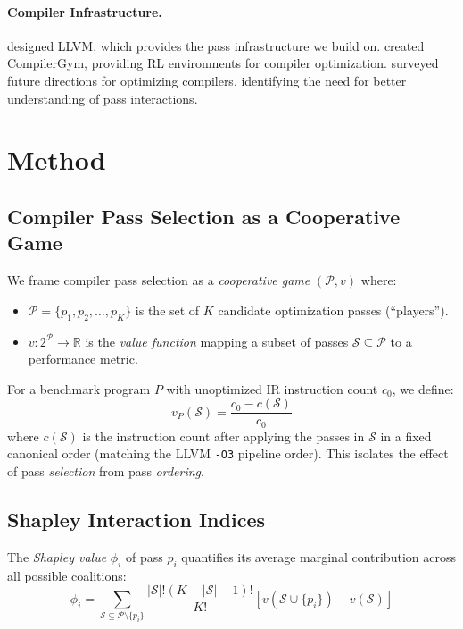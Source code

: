 \documentclass[preprint]{article}
\newcommand{\shapval}{\phi}
\newcommand{\passset}{\mathcal{S}}
\newcommand{\allpasses}{\mathcal{P}}
\newcommand{\valfn}{v}
\begin{document}
\paragraph{Compiler Infrastructure.}
\citet{lattner2004llvm} designed LLVM, which provides the pass infrastructure we build on. \citet{cummins2022compilergym} created CompilerGym, providing RL environments for compiler optimization. \citet{lopes2018future} surveyed future directions for optimizing compilers, identifying the need for better understanding of pass interactions.

\section{Method}
\label{sec:method}

\subsection{Compiler Pass Selection as a Cooperative Game}

We frame compiler pass selection as a \emph{cooperative game} $(\allpasses, \valfn)$ where:
\begin{itemize}
    \item $\allpasses = \{p_1, p_2, \ldots, p_K\}$ is the set of $K$ candidate optimization passes (``players'').
    \item $\valfn: 2^{\allpasses} \to \mathbb{R}$ is the \emph{value function} mapping a subset of passes $\passset \subseteq \allpasses$ to a performance metric.
\end{itemize}

For a benchmark program $P$ with unoptimized IR instruction count $c_0$, we define:
\begin{equation}
    \valfn_P(\passset) = \frac{c_0 - c(\passset)}{c_0}
\end{equation}
where $c(\passset)$ is the instruction count after applying the passes in $\passset$ in a fixed canonical order (matching the LLVM \texttt{-O3} pipeline order). This isolates the effect of pass \emph{selection} from pass \emph{ordering}.

\subsection{Shapley Interaction Indices}

The \emph{Shapley value} $\shapval_i$ of pass $p_i$ quantifies its average marginal contribution across all possible coalitions:
\begin{equation}
    \shapval_i = \sum_{\passset \subseteq \allpasses \setminus \{p_i\}} \frac{|\passset|!(K - |\passset| - 1)!}{K!} \left[\valfn(\passset \cup \{p_i\}) - \valfn(\passset)\right]
\end{equation}
\end{document}
